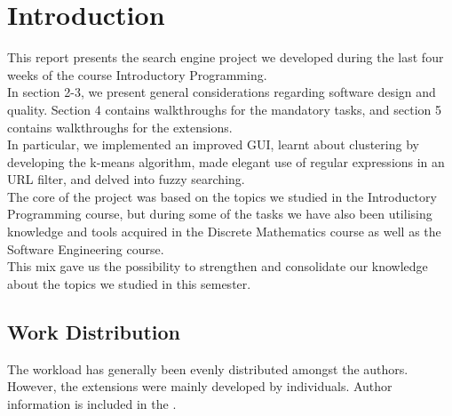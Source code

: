 \section{Introduction}
This report presents the search engine project we developed during the last four weeks of the course Introductory Programming.
\\
In section 2-3, we present general considerations regarding software design and quality. Section 4 contains walkthroughs for the mandatory tasks, and section 5 contains walkthroughs for the extensions.
\\
In particular, we implemented an improved GUI, learnt about clustering by developing the k-means algorithm, made elegant use of regular expressions in an URL filter, and delved into fuzzy searching.
\\
The core of the project was based on the topics we studied in the Introductory Programming course, but during some of the tasks we have also been utilising  knowledge and tools acquired in the Discrete Mathematics course as well as the Software Engineering course.
\\
This mix gave us the possibility to strengthen and consolidate our knowledge about the topics we studied in this semester.
\subsection{Work Distribution}
The workload has generally been evenly distributed amongst the authors. However, the extensions were mainly developed by individuals. Author information is included in the .